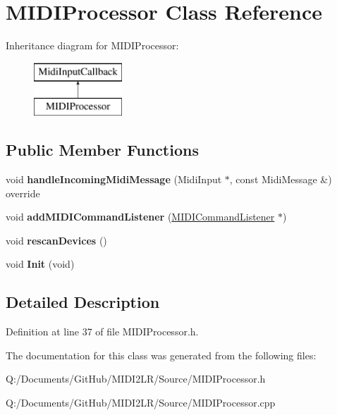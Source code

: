 \hypertarget{class_m_i_d_i_processor}{}\section{M\+I\+D\+I\+Processor Class Reference}
\label{class_m_i_d_i_processor}
Inheritance diagram for M\+I\+D\+I\+Processor\+:\begin{figure}[H]
\begin{center}
\leavevmode
\includegraphics[height=2.000000cm]{class_m_i_d_i_processor}
\end{center}
\end{figure}
\subsection*{Public Member Functions}
\begin{DoxyCompactItemize}
\item 
void {\bfseries handle\+Incoming\+Midi\+Message} (Midi\+Input $\ast$, const Midi\+Message \&) override\hypertarget{class_m_i_d_i_processor_a373aab7c369e94b1f1a59ca78f78111e}{}\label{class_m_i_d_i_processor_a373aab7c369e94b1f1a59ca78f78111e}

\item 
void {\bfseries add\+M\+I\+D\+I\+Command\+Listener} (\hyperlink{class_m_i_d_i_command_listener}{M\+I\+D\+I\+Command\+Listener} $\ast$)\hypertarget{class_m_i_d_i_processor_a9b05cdfb5dc81f134ae7d88873b44ade}{}\label{class_m_i_d_i_processor_a9b05cdfb5dc81f134ae7d88873b44ade}

\item 
void {\bfseries rescan\+Devices} ()\hypertarget{class_m_i_d_i_processor_a9b05a1d09a8cff97d6b158cb4270f2e7}{}\label{class_m_i_d_i_processor_a9b05a1d09a8cff97d6b158cb4270f2e7}

\item 
void {\bfseries Init} (void)\hypertarget{class_m_i_d_i_processor_a5368c02640c7493c0119deadfe2feeba}{}\label{class_m_i_d_i_processor_a5368c02640c7493c0119deadfe2feeba}

\end{DoxyCompactItemize}


\subsection{Detailed Description}


Definition at line 37 of file M\+I\+D\+I\+Processor.\+h.



The documentation for this class was generated from the following files\+:\begin{DoxyCompactItemize}
\item 
Q\+:/\+Documents/\+Git\+Hub/\+M\+I\+D\+I2\+L\+R/\+Source/M\+I\+D\+I\+Processor.\+h\item 
Q\+:/\+Documents/\+Git\+Hub/\+M\+I\+D\+I2\+L\+R/\+Source/M\+I\+D\+I\+Processor.\+cpp\end{DoxyCompactItemize}
